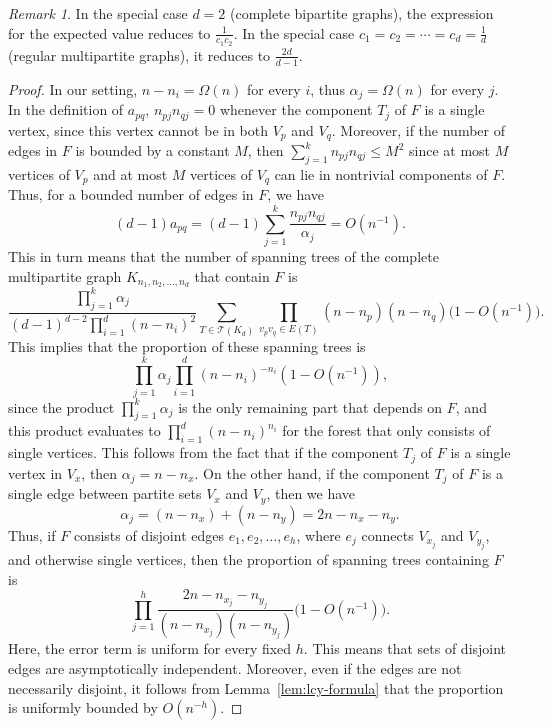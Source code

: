 \documentclass[a4paper,12pt,reqno]{amsart}
\theoremstyle{remark}
\newtheorem{remark}{Remark}
\newcommand{\ga}{\alpha}
\begin{document}
\begin{remark}
    In the special case $d=2$ (complete bipartite graphs), the expression for the expected value reduces to $\frac{1}{c_1c_2}$. In the special case $c_1 = c_2 = \cdots = c_d = \frac1d$ (regular multipartite graphs), it reduces to $\frac{2d}{d-1}$.
\end{remark}

\begin{proof}
In our setting, $n - n_i = \Omega(n)$ for every $i$, thus $\ga_j = \Omega(n)$ for every $j$. In the definition of $a_{pq}$, $n_{pj}n_{qj} = 0$ whenever the component $T_j$ of $F$ is a single vertex, since this vertex cannot be in both $V_p$ and $V_q$. Moreover, if the number of edges in $F$ is bounded by a constant $M$, then $\sum_{j=1}^k n_{pj}n_{qj} \leq M^2$ since at most $M$ vertices of $V_p$ and at most $M$ vertices of $V_q$ can lie in nontrivial components of $F$. Thus, for a bounded number of edges in $F$, we have
\[(d-1)a_{pq} = (d-1) \sum_{j=1}^k \frac{n_{pj}n_{qj}}{\ga_j} = O(n^{-1}).\]
This in turn means that the number of spanning trees of the complete multipartite graph $K_{n_1,n_2,\ldots,n_d}$ that contain $F$ is
\[\frac{\prod_{j=1}^k \ga_j}{(d-1)^{d-2} \prod_{i=1}^d (n-n_i)^2} \sum_{T \in \mathcal{T}(K_d)} \prod_{v_pv_q \in E(T)} (n-n_p)(n-n_q) \big( 1 - O(n^{-1}) \big).\]
This implies that the proportion of these spanning trees is \[\prod_{j=1}^k \ga_j \prod_{i=1}^d (n-n_i)^{-n_i} (1 - O(n^{-1})),\] since the product $\prod_{j=1}^k \ga_j$ is the only remaining part that depends on $F$, and this product evaluates to $\prod_{i=1}^d (n-n_i)^{n_i}$ for the forest that only consists of single vertices. This follows from the fact that if the component $T_j$ of $F$ is a single vertex in $V_x$, then $\ga_j = n-n_x$. On the other hand, 
if the component $T_j$ of $F$ is a single edge between partite sets $V_x$ and $V_y$, then we have
\[\ga_j = (n-n_x) + (n-n_y) = 2n-n_x-n_y.\]
Thus, if $F$ consists of disjoint edges $e_1,e_2,\ldots,e_h$, where $e_j$ connects $V_{x_j}$ and $V_{y_j}$, and otherwise single vertices, then the proportion of spanning trees containing $F$ is
\begin{equation}\label{eq:asymp_indep}
\prod_{j=1}^h \frac{2n-n_{x_j}-n_{y_j}}{(n-n_{x_j})(n-n_{y_j})}  \big( 1 - O(n^{-1}) \big).
\end{equation}
Here, the error term is uniform for every fixed $h$. This means that sets of disjoint edges are asymptotically independent. Moreover, even if the edges are not necessarily disjoint, it follows from Lemma~\ref{lem:lcy-formula} that the proportion is uniformly bounded by $O(n^{-h})$.


\end{proof}
\end{document}
